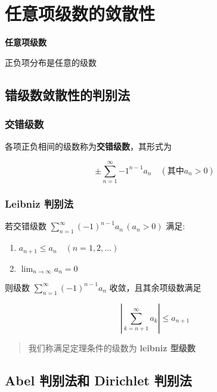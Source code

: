 \documentclass[lang = zh , final , oneside , openany , titlepage , zihao = -4 , linespread = 1.3 , baselineskip = false , cjk-font = windows , text-font = newtx , math-font = newtx , math-style = TeX]{sjtureport}
\begin{document}
\section{任意项级数的敛散性}

\textbf{任意项级数}

正负项分布是任意的级数

\subsection{错级数敛散性的判别法}

\subsubsection{交错级数}

\begin{definition}
    各项正负相间的级数称为\textbf{交错级数}，其形式为

\[\pm\sum_{n=1}^\infty {-1}^{n-1}a_n \quad \left(\text{其中}a_n > 0\right)\]
\end{definition}

\subsubsection{Leibniz 判别法}

\begin{definition}
    若交错级数
\(\displaystyle \sum_{n=1}^\infty (-1)^{n-1}a_n \,\left(a_n>0\right)\)
满足:

\begin{enumerate}
\item
  \(a_{n+1} \leq a_n \quad \left(n = 1 ,2 ,\ldots\right)\)
\item
  \(\displaystyle\lim_{n\to\infty}a_n =0\)
\end{enumerate}

则级数 \(\displaystyle \sum_{n=1}^\infty (-1)^{n-1}a_n\)
收敛，且其余项级数满足

\[\left\vert \sum_{k=n+1}^\infty a_k \right\vert \leq a_{n+1}\]

\begin{quote}
我们称满足定理条件的级数为 \textbf{leibniz 型级数}
\end{quote}
\end{definition}

\subsection{Abel 判别法和 Dirichlet 判别法}
\end{document}
